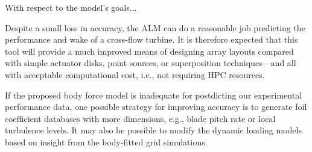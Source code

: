 With respect to the model's goals...

Despite a small loss in accuracy, the ALM can do a reasonable job predicting the
performance and wake of a cross-flow turbine. It is therefore expected that this
tool will provide a much improved means of designing array layouts compared with
simple actuator disks, point sources, or superposition techniques---and all with
acceptable computational cost, i.e., not requiring HPC resources.


If the proposed body force model is inadequate for postdicting our experimental
performance data, one possible strategy for improving accuracy is to generate
foil coefficient databases with more dimensions, e.g., blade pitch rate or local
turbulence levels. It may also be possible to modify the dynamic loading models
based on insight from the body-fitted grid simulations.
